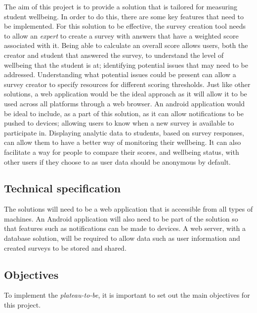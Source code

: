 The aim of this project is to provide a solution that is tailored for measuring student wellbeing. 
In order to do this, there are some key features that need to be implemented.
For this solution to be effective, the survey creation tool needs to allow an \textit{expert} to create a survey with answers that have 
a weighted score associated with it. 
Being able to calculate an overall score allows users, both the creator and student that answered the survey, to understand the level of 
wellbeing that the student is at; identifying potential issues that may need to be addressed.
Understanding what potential issues could be present can allow a survey creator to specify resources for different scoring thresholds.
Just like other solutions, a web application would be the ideal approach as it will allow it to be used across all platforms through a web
browser.
An android application would be ideal to include, as a part of this solution, as it can allow notifications to be pushed to devices; allowing
users to know when a new survey is available to participate in.
Displaying analytic data to students, based on survey responses, can allow them to have a better way of monitoring their wellbeing.
It can also facilitate a way for people to compare their scores, and wellbeing status, with other users if they choose to as user data should be
anonymous by default.



\subsection{Technical specification}

The solutions will need to be a web application that is accessible from all types of machines. 
An Android application will also need to be part of the solution so that features such as notifications can be made to devices.
A web server, with a database solution, will be required to allow data such as user information and created surveys to be 
stored and shared.




\subsection{Objectives}
To implement the \textit{plateau-to-be}, it is important to set out the main objectives for this project.

